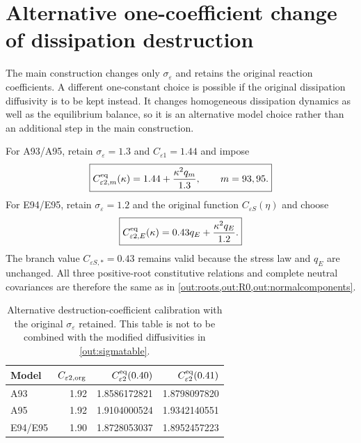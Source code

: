 \documentclass[11pt,a4paper]{article}
\numberwithin{equation}{section}
\newcommand{\eps}{\varepsilon}
\begin{document}
\section{Alternative one-coefficient change of dissipation destruction}
\label{out:appendixCeps2}

The main construction changes only $\sigma_\eps$ and retains the
original reaction coefficients. A different one-constant choice is
possible if the original dissipation diffusivity is to be kept instead.
It changes homogeneous dissipation dynamics as well as the equilibrium
balance, so it is an alternative model choice rather than an additional
step in the main construction.

For A93/A95, retain $\sigma_\eps=1.3$ and $C_{\eps1}=1.44$ and impose
\begin{equation}
 \boxed{C_{\eps2,m}^{\rm eq}(\kappa)
 =1.44+\frac{\kappa^2q_m}{1.3},\qquad m=93,95.}
 \label{out:Ceps2A}
\end{equation}
For E94/E95, retain $\sigma_\eps=1.2$ and the original function
$C_{\eps S}(\eta)$ and choose
\begin{equation}
 \boxed{C_{\eps2,E}^{\rm eq}(\kappa)
 =0.43q_E+\frac{\kappa^2q_E}{1.2}.}
 \label{out:Ceps2E}
\end{equation}
The branch value $C_{\eps S,*}=0.43$ remains valid because the stress
law and $q_E$ are unchanged. All three positive-root constitutive
relations and complete neutral covariances are therefore the same as
in \cref{out:roots,out:R0,out:normalcomponents}.

\begin{table}[htbp]
\centering
\caption{Alternative destruction-coefficient calibration with the
original $\sigma_\eps$ retained. This table is not to be combined with
the modified diffusivities in \cref{out:sigmatable}.}
\label{out:Ceps2table}
\begin{tabular}{lrrr}
\toprule
Model & $C_{\eps2,\rm org}$
& $C_{\eps2}^{\rm eq}(0.40)$
& $C_{\eps2}^{\rm eq}(0.41)$\\
\midrule
A93 & 1.92 & 1.8586172821 & 1.8798097820\\
A95 & 1.92 & 1.9104000524 & 1.9342140551\\
E94/E95 & 1.90 & 1.8728053037 & 1.8952457223\\
\bottomrule
\end{tabular}
\end{table}
\end{document}
